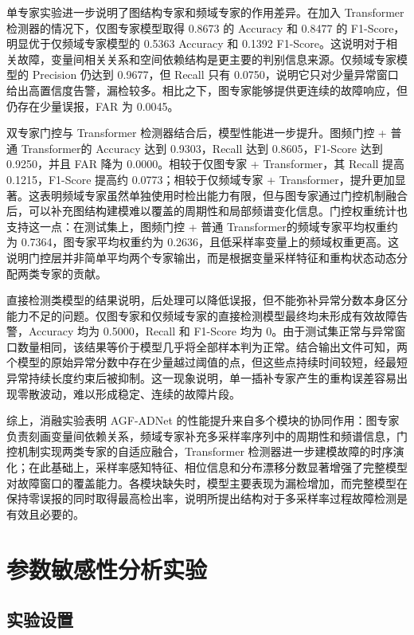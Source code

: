 \documentclass[bachelor, vlined]{DissertUESTC}
\begin{document}
    单专家实验进一步说明了图结构专家和频域专家的作用差异。在加入 Transformer 检测器的情况下，仅图专家模型取得 0.8673 的 Accuracy 和 0.8477 的 F1-Score，明显优于仅频域专家模型的 0.5363 Accuracy 和 0.1392 F1-Score。这说明对于相关故障，变量间相关关系和空间依赖结构是更主要的判别信息来源。仅频域专家模型的 Precision 仍达到 0.9677，但 Recall 只有 0.0750，说明它只对少量异常窗口给出高置信度告警，漏检较多。相比之下，图专家能够提供更连续的故障响应，但仍存在少量误报，FAR 为 0.0045。

    双专家门控与 Transformer 检测器结合后，模型性能进一步提升。图频门控 + 普通 Transformer的 Accuracy 达到 0.9303，Recall 达到 0.8605，F1-Score 达到 0.9250，并且 FAR 降为 0.0000。相较于仅图专家 + Transformer，其 Recall 提高 0.1215，F1-Score 提高约 0.0773；相较于仅频域专家 + Transformer，提升更加显著。这表明频域专家虽然单独使用时检出能力有限，但与图专家通过门控机制融合后，可以补充图结构建模难以覆盖的周期性和局部频谱变化信息。门控权重统计也支持这一点：在测试集上，图频门控 + 普通 Transformer的频域专家平均权重约为 0.7364，图专家平均权重约为 0.2636，且低采样率变量上的频域权重更高。这说明门控层并非简单平均两个专家输出，而是根据变量采样特征和重构状态动态分配两类专家的贡献。

    直接检测类模型的结果说明，后处理可以降低误报，但不能弥补异常分数本身区分能力不足的问题。仅图专家和仅频域专家的直接检测模型最终均未形成有效故障告警，Accuracy 均为 0.5000，Recall 和 F1-Score 均为 0。由于测试集正常与异常窗口数量相同，该结果等价于模型几乎将全部样本判为正常。结合输出文件可知，两个模型的原始异常分数中存在少量越过阈值的点，但这些点持续时间较短，经最短异常持续长度约束后被抑制。这一现象说明，单一插补专家产生的重构误差容易出现零散波动，难以形成稳定、连续的故障片段。

    综上，消融实验表明 AGF-ADNet 的性能提升来自多个模块的协同作用：图专家负责刻画变量间依赖关系，频域专家补充多采样率序列中的周期性和频谱信息，门控机制实现两类专家的自适应融合，Transformer 检测器进一步建模故障的时序演化；在此基础上，采样率感知特征、相位信息和分布漂移分数显著增强了完整模型对故障窗口的覆盖能力。各模块缺失时，模型主要表现为漏检增加，而完整模型在保持零误报的同时取得最高检出率，说明所提出结构对于多采样率过程故障检测是有效且必要的。

    \section{参数敏感性分析实验}
    \label{sec:sensitivity_report}
    
    \subsection{实验设置}
    
\end{document}

